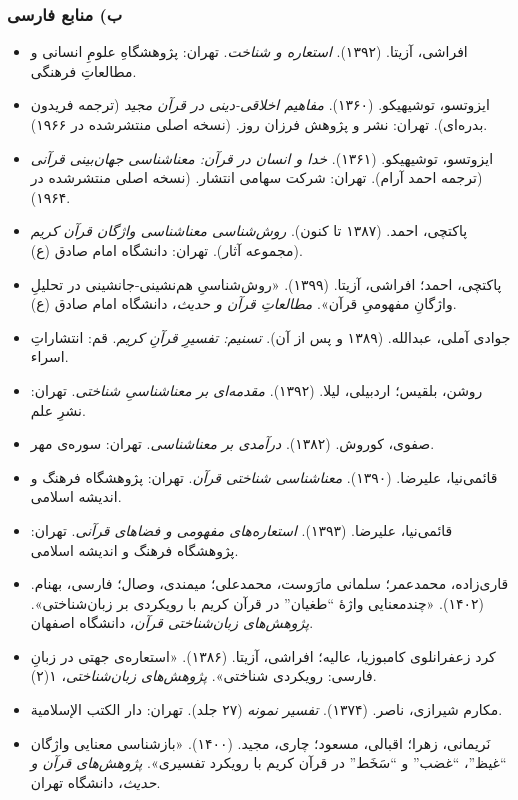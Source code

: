\documentclass[12pt,a4paper]{article}
\providecommand{\tightlist}{\setlength{\itemsep}{0pt}\setlength{\parskip}{0pt}}
\begin{document}
\begin{RTL}
\begin{otherlanguage}{persian}
\subsubsection{ب) منابع
فارسی}\label{ux628-ux645ux646ux627ux628ux639-ux641ux627ux631ux633ux6cc}

\begin{itemize}
\tightlist
\item
  افراشی، آزیتا. (۱۳۹۲). \emph{استعاره و شناخت}. تهران: پژوهشگاهِ علومِ
  انسانی و مطالعاتِ فرهنگی.
\item
  ایزوتسو، توشیهیکو. (۱۳۶۰). \emph{مفاهیم اخلاقی-دینی در قرآن مجید}
  (ترجمه فریدون بدره‌ای). تهران: نشر و پژوهش فرزان روز. (نسخه اصلی
  منتشرشده در ۱۹۶۶).
\item
  ایزوتسو، توشیهیکو. (۱۳۶۱). \emph{خدا و انسان در قرآن: معناشناسی
  جهان‌بینی قرآنی} (ترجمه احمد آرام). تهران: شرکت سهامی انتشار. (نسخه
  اصلی منتشرشده در ۱۹۶۴).
\item
  پاکتچی، احمد. (۱۳۸۷ تا کنون). \emph{روش‌شناسی معناشناسی واژگان قرآن
  کریم} (مجموعه آثار). تهران: دانشگاه امام صادق (ع).
\item
  پاکتچی، احمد؛ افراشی، آزیتا. (۱۳۹۹). «روش‌شناسیِ هم‌نشینی-جانشینی در
  تحلیلِ واژگانِ مفهومیِ قرآن». \emph{مطالعاتِ قرآن و حدیث}، دانشگاه امام
  صادق (ع).
\item
  جوادی آملی، عبدالله. (۱۳۸۹ و پس از آن). \emph{تسنیم: تفسیرِ قرآنِ کریم}.
  قم: انتشاراتِ اسراء.
\item
  روشن، بلقیس؛ اردبیلی، لیلا. (۱۳۹۲). \emph{مقدمه‌ای بر معناشناسیِ
  شناختی}. تهران: نشرِ علم.
\item
  صفوی، کوروش. (۱۳۸۲). \emph{درآمدی بر معناشناسی}. تهران: سوره‌ی مهر.
\item
  قائمی‌نیا، علیرضا. (۱۳۹۰). \emph{معناشناسی شناختی قرآن}. تهران:
  پژوهشگاه فرهنگ و اندیشه اسلامی.
\item
  قائمی‌نیا، علیرضا. (۱۳۹۳). \emph{استعاره‌های مفهومی و فضاهای قرآنی}.
  تهران: پژوهشگاه فرهنگ و اندیشه اسلامی.
\item
  قاری‌زاده، محمدعمر؛ سلمانی مارَوست، محمدعلی؛ میمندی، وصال؛ فارسی، بهنام.
  (۱۴۰۲). «چندمعنایی واژۀ ``طغیان'' در قرآن کریم با رویکردی بر
  زبان‌شناختی». \emph{پژوهش‌های زبان‌شناختی قرآن}، دانشگاه اصفهان.
\item
  کرد زعفرانلوی کامبوزیا، عالیه؛ افراشی، آزیتا. (۱۳۸۶). «استعاره‌ی جهتی
  در زبانِ فارسی: رویکردی شناختی». \emph{پژوهش‌های زبان‌شناختی}، ۱(۲).
\item
  مکارم شیرازی، ناصر. (۱۳۷۴). \emph{تفسیر نمونه} (۲۷ جلد). تهران: دار
  الکتب الإسلامیة.
\item
  نَریمانی، زهرا؛ اقبالی، مسعود؛ چاری، مجید. (۱۴۰۰). «بازشناسی معنایی
  واژگان ``غیظ''، ``غضب'' و ``سَخَط'' در قرآن کریم با رویکرد تفسیری».
  \emph{پژوهش‌های قرآن و حدیث}، دانشگاه تهران.
\end{itemize}


\end{otherlanguage}
\end{RTL}
\end{document}
